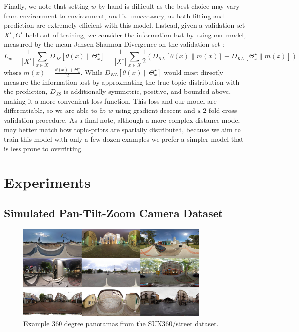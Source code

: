 Finally, we note that setting $w$ by hand is difficult as the best choice may vary from environment to environment, and is unnecessary, as both fitting and prediction are extremely efficient with this model. Instead, given a validation set $X^\star, \Theta^\star$ held out of training, we consider the information lost by using our model, measured by the mean Jensen-Shannon Divergence on the validation set \citep{lin1991divergence}:
\begin{equation}
L_w = \frac{1}{|X^\star|} \sum_{x \in X} D_{JS}\left[\theta(x) \| \Theta^\star_x \right]
 =  \frac{1}{|X^\star|} \sum_{x \in X} \frac{1}{2} \left(D_{KL}\left[\theta(x) \| m(x) \right] + D_{KL}\left[\Theta^\star_x \| m(x) \right]\right)
\end{equation}
where $m(x) = \frac{\theta(x)+\Theta^\star_x}{2}$. While $D_{KL}\left[\theta(x) \| \Theta^\star_x \right]$ would most directly measure the information lost by approxmating the true topic distribution with the prediction, $D_{JS}$ is additionally symmetric, positive, and bounded above, making it a more convenient loss function. This loss and our model are differentiable, so we are able to fit $w$ using gradient descent and a 2-fold cross-validation procedure. As a final note, although a more complex distance model may better match how topic-priors are spatially distributed, because we aim to train this model with only a few dozen examples we prefer a simpler model that is less prone to overfitting.

\section{Experiments}
\subsection{Simulated Pan-Tilt-Zoom Camera Dataset}
\begin{figure}
    \centering
    \includegraphics[width=0.85\textwidth]{figures/ptz/sun360_9x.jpg}
    \caption{Example 360 degree panoramas from the SUN360/street dataset.}
    \label{fig:sun360_ex}
\end{figure}

